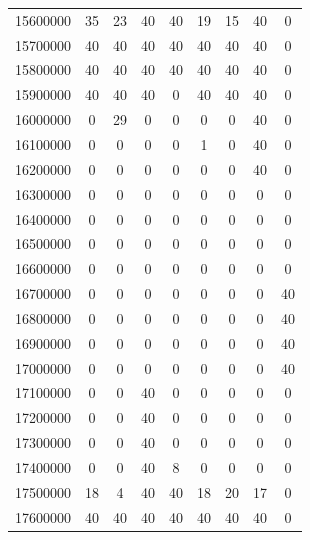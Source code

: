 \begin{table}[H]
\begin{center}
\begin{tabular}{| c | c | c | c | c | c | c | c | c |}
15600000       &  35     &  23    &  40    & 40     & 19     & 15     & 40     & 0 \\
15700000       &  40     &  40    &  40    & 40     & 40     & 40     & 40     & 0 \\
15800000       &  40     &  40    &  40    & 40     & 40     & 40     & 40     & 0 \\
15900000       &  40     &  40    &  40    & 0      & 40     & 40     & 40     & 0 \\
    \hline
16000000       &  0      &  29    &  0     & 0      & 0      & 0      & 40     & 0 \\
16100000       &  0      &  0     &  0     & 0      & 1      & 0      & 40     & 0 \\
16200000       &  0      &  0     &  0     & 0      & 0      & 0      & 40     & 0 \\
16300000       &  0      &  0     &  0     & 0      & 0      & 0      & 0      & 0 \\
16400000       &  0      &  0     &  0     & 0      & 0      & 0      & 0      & 0 \\
16500000       &  0      &  0     &  0     & 0      & 0      & 0      & 0      & 0 \\
16600000       &  0      &  0     &  0     & 0      & 0      & 0      & 0      & 0 \\
16700000       &  0      &  0     &  0     & 0      & 0      & 0      & 0      & 40 \\
16800000       &  0      &  0     &  0     & 0      & 0      & 0      & 0      & 40 \\
16900000       &  0      &  0     &  0     & 0      & 0      & 0      & 0      & 40 \\
    \hline
17000000       &  0      &  0     &  0     & 0      & 0      & 0      & 0      & 40 \\
17100000       &  0      &  0     &  40    & 0      & 0      & 0      & 0      & 0 \\
17200000       &  0      &  0     &  40    & 0      & 0      & 0      & 0      & 0 \\
17300000       &  0      &  0     &  40    & 0      & 0      & 0      & 0      & 0 \\
17400000       &  0      &  0     &  40    & 8      & 0      & 0      & 0      & 0 \\
17500000       &  18     &  4     &  40    & 40     & 18     & 20     & 17     & 0 \\
17600000       &  40     &  40    &  40    & 40     & 40     & 40     & 40     & 0 \\

\end{tabular}
\end{center}
\end{table}
